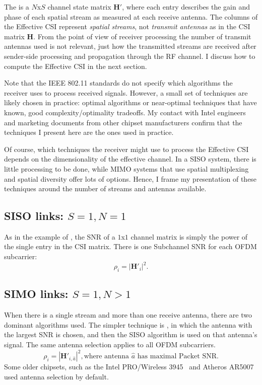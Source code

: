 The  is a $N$x$S$ channel state matrix $\mathbf{H}'$, where each entry describes the gain and phase of each spatial stream as measured at each receive antenna. The columns of the Effective CSI represent \emph{spatial streams}, not \emph{transmit antennas} as in the CSI matrix $\mathbf{H}$. From the point of view of receiver processing the number of transmit antennas used is not relevant, just how the transmitted streams are received after sender-side processing and propagation through the RF channel. I discuss how to compute the Effective CSI in the next section.

Note that the IEEE 802.11 standards do not specify which algorithms the receiver uses to process received signals. However, a small set of techniques are likely chosen in practice: optimal algorithms or near-optimal techniques that have known, good complexity/optimality tradeoffs. My contact with Intel engineers and marketing documents from other chipset manufacturers confirm that the techniques I present here are the ones used in practice.

Of course, which techniques the receiver might use to process the Effective CSI depends on the dimensionality of the effective channel. In a SISO system, there is little processing to be done, while MIMO systems that use spatial multiplexing and spatial diversity offer lots of options. Hence, I frame my presentation of these techniques around the number of streams and antennas available.

\subsection{SISO links: $S=1,N=1$}
As in the example of , the SNR of a $1$x$1$ channel matrix is simply the power of the single entry in the CSI matrix. There is one Subchannel SNR for each OFDM subcarrier:
\begin{equation}
	\rho_i = \left| \mathbf{H}'_i \right|^2.
\end{equation}

\subsection{SIMO links: $S=1,N>1$}
When there is a single stream and more than one receive antenna, there are two dominant algorithms used. The simpler technique is , in which the antenna with the largest SNR is chosen, and then the SISO algorithm is used on that antenna's signal. The same antenna selection applies to all OFDM subcarriers.
\begin{equation}
	\rho_i = \left| \mathbf{H}'_{i,\hat{a}} \right|^2, \text{where antenna } \hat{a} \text{ has maximal Packet SNR}.
\end{equation}
Some older chipsets, such as the Intel PRO/Wireless 3945~\cite[\S3.5]{ipw3945} and Atheros AR5007~\cite{madwifi_diversity} used antenna selection by default.

